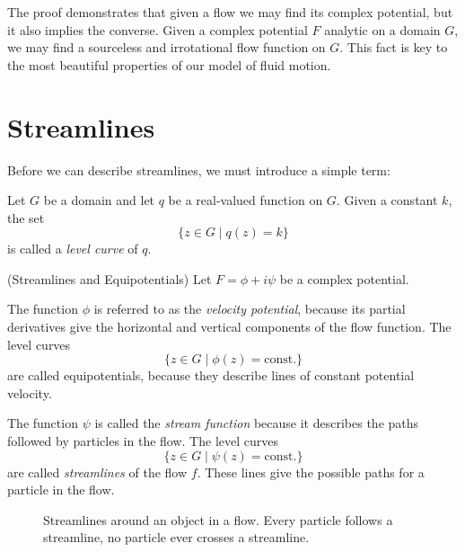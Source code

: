 \documentclass[letterpaper, twoside, 12 pt]{article}
\begin{document}
	\begin{remark}
		The proof demonstrates that given a flow we may find its complex potential, but it also implies the converse.
		Given a complex potential $F$ analytic on a domain $G$, we may find a sourceless and irrotational flow function on $G$.
		This fact is key to the most beautiful properties of our model of fluid motion.
	\end{remark}



\section{Streamlines} %
\label{sec:streamlines}

	Before we can describe streamlines, we must introduce a simple term:\
	\begin{definition}
		Let $G$ be a domain and let $q$ be a real-valued function on $G$.
		Given a constant $k$, the set 
		\[
			\{ z \in G \mid q(z) = k \}
		\]
		is called a \textit{level curve} of $q$.
	\end{definition}

	\begin{definition}(Streamlines and Equipotentials)
		Let $F = \phi + i \psi$ be a complex potential.

		The function $\phi$ is referred to as the \textit{velocity potential}, because its partial derivatives give the horizontal and vertical components of the flow function.
		The level curves 
		\[
			\{ z \in G \mid \phi(z) = \mathrm{const.} \}
		\]
		are called equipotentials, because they describe lines of constant potential velocity.

		The function $\psi$ is called the \textit{stream function} because it describes the paths followed by particles in the flow.
		The level curves 
		\[
			\{ z \in G \mid \psi(z) = \mathrm{const.} \}
		\]
		are called \textit{streamlines} of the flow $f$.
		These lines give the possible paths for a particle in the flow.
	\end{definition}

	\begin{figure}[H]
		\centering
		\begin{tikzpicture}
			
		\end{tikzpicture}
		\captionsetup{width = 0.5 \textwidth}
		\caption{
			Streamlines around an object in a flow.
			Every particle follows a streamline, no particle ever crosses a streamline.
		}
		\label{fig:streamlines}
	\end{figure}
\end{document}
